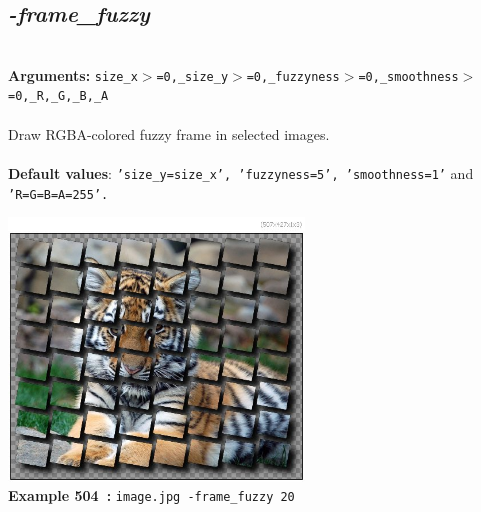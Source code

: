 \documentclass[a4paper,11pt,twoside]{book}
\begin{document}
\subsection{\emph{-frame\_fuzzy} }\vspace*{-0.5em}
~\\\textbf{Arguments: } 
{\small \texttt{size\_x$>$=0,\_size\_y$>$=0,\_fuzzyness$>$=0,\_smoothness$>$=0,\_R,\_G,\_B,\_A}}\\~\\
Draw RGBA-colored fuzzy frame in selected images.
~\\~\\\textbf{Default values}: {\small \texttt{'size\_y=size\_x', 'fuzzyness=5', 'smoothness=1'} and \texttt{'R=G=B=A=255'.}}
\begin{center}\includegraphics[keepaspectratio=true,height=7cm,width=\textwidth]{img/gmic_def504.jpg}\\
{\footnotesize \textbf{Example 504~:} \texttt{image.jpg -frame\_fuzzy 20}}
\end{center}
\end{document}
